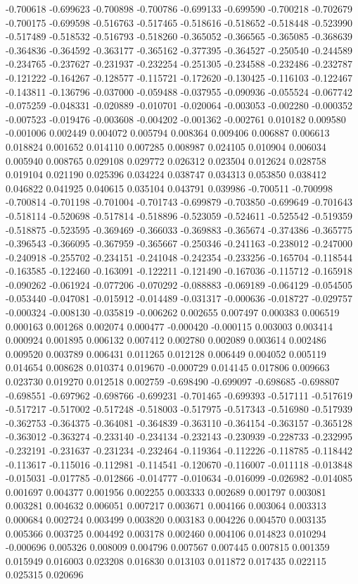 -0.700618
-0.699623
-0.700898
-0.700786
-0.699133
-0.699590
-0.700218
-0.702679
-0.700175
-0.699598
-0.516763
-0.517465
-0.518616
-0.518652
-0.518448
-0.523990
-0.517489
-0.518532
-0.516793
-0.518260
-0.365052
-0.366565
-0.365085
-0.368639
-0.364836
-0.364592
-0.363177
-0.365162
-0.377395
-0.364527
-0.250540
-0.244589
-0.234765
-0.237627
-0.231937
-0.232254
-0.251305
-0.234588
-0.232486
-0.232787
-0.121222
-0.164267
-0.128577
-0.115721
-0.172620
-0.130425
-0.116103
-0.122467
-0.143811
-0.136796
-0.037000
-0.059488
-0.037955
-0.090936
-0.055524
-0.067742
-0.075259
-0.048331
-0.020889
-0.010701
-0.020064
-0.003053
-0.002280
-0.000352
-0.007523
-0.019476
-0.003608
-0.004202
-0.001362
-0.002761
0.010182
0.009580
-0.001006
0.002449
0.004072
0.005794
0.008364
0.009406
0.006887
0.006613
0.018824
0.001652
0.014110
0.007285
0.008987
0.024105
0.010904
0.006034
0.005940
0.008765
0.029108
0.029772
0.026312
0.023504
0.012624
0.028758
0.019104
0.021190
0.025396
0.034224
0.038747
0.034313
0.053850
0.038412
0.046822
0.041925
0.040615
0.035104
0.043791
0.039986
-0.700511
-0.700998
-0.700814
-0.701198
-0.701004
-0.701743
-0.699879
-0.703850
-0.699649
-0.701643
-0.518114
-0.520698
-0.517814
-0.518896
-0.523059
-0.524611
-0.525542
-0.519359
-0.518875
-0.523595
-0.369469
-0.366033
-0.369883
-0.365674
-0.374386
-0.365775
-0.396543
-0.366095
-0.367959
-0.365667
-0.250346
-0.241163
-0.238012
-0.247000
-0.240918
-0.255702
-0.234151
-0.241048
-0.242354
-0.233256
-0.165704
-0.118544
-0.163585
-0.122460
-0.163091
-0.122211
-0.121490
-0.167036
-0.115712
-0.165918
-0.090262
-0.061924
-0.077206
-0.070292
-0.088883
-0.069189
-0.064129
-0.054505
-0.053440
-0.047081
-0.015912
-0.014489
-0.031317
-0.000636
-0.018727
-0.029757
-0.000324
-0.008130
-0.035819
-0.006262
0.002655
0.007497
0.000383
0.006519
0.000163
0.001268
0.002074
0.000477
-0.000420
-0.000115
0.003003
0.003414
0.000924
0.001895
0.006132
0.007412
0.002780
0.002089
0.003614
0.002486
0.009520
0.003789
0.006431
0.011265
0.012128
0.006449
0.004052
0.005119
0.014654
0.008628
0.010374
0.019670
-0.000729
0.014145
0.017806
0.009663
0.023730
0.019270
0.012518
0.002759
-0.698490
-0.699097
-0.698685
-0.698807
-0.698551
-0.697962
-0.698766
-0.699231
-0.701465
-0.699393
-0.517111
-0.517619
-0.517217
-0.517002
-0.517248
-0.518003
-0.517975
-0.517343
-0.516980
-0.517939
-0.362753
-0.364375
-0.364081
-0.364839
-0.363110
-0.364154
-0.363157
-0.365128
-0.363012
-0.363274
-0.233140
-0.234134
-0.232143
-0.230939
-0.228733
-0.232995
-0.232191
-0.231637
-0.231234
-0.232464
-0.119364
-0.112226
-0.118785
-0.118442
-0.113617
-0.115016
-0.112981
-0.114541
-0.120670
-0.116007
-0.011118
-0.013848
-0.015031
-0.017785
-0.012866
-0.014777
-0.010634
-0.016099
-0.026982
-0.014085
0.001697
0.004377
0.001956
0.002255
0.003333
0.002689
0.001797
0.003081
0.003281
0.004632
0.006051
0.007217
0.003671
0.004166
0.003064
0.003313
0.000684
0.002724
0.003499
0.003820
0.003183
0.004226
0.004570
0.003135
0.005366
0.003725
0.004492
0.003178
0.002460
0.004106
0.014823
0.010294
-0.000696
0.005326
0.008009
0.004796
0.007567
0.007445
0.007815
0.001359
0.015949
0.016003
0.023208
0.016830
0.013103
0.011872
0.017435
0.022115
0.025315
0.020696
